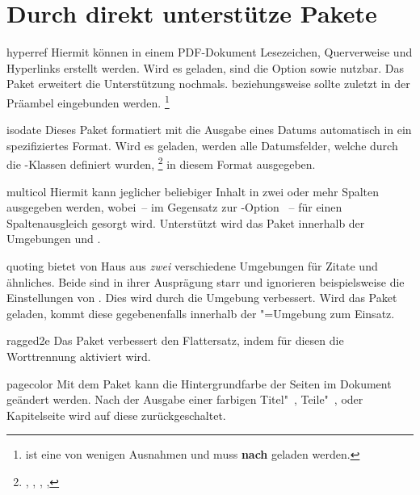 \section{Durch \TUDScript direkt unterstütze Pakete}
%
\begin{packages}
\item[hyperref]
  Hiermit können in einem PDF-Dokument Lesezeichen, Querverweise und   
  Hyperlinks erstellt werden. Wird es geladen, sind die Option 
   sowie  nutzbar. Das Paket 
   erweitert die Unterstützung nochmals.  
  beziehungsweise  sollte zuletzt in der Präambel eingebunden 
  werden.%
  \footnote{%
     ist eine von wenigen Ausnahmen und muss \textbf{nach} 
     geladen werden.
  }
\item[isodate]
  Dieses Paket formatiert mit  die Ausgabe 
  eines Datums automatisch in ein spezifiziertes Format. Wird es geladen, 
  werden alle Datumsfelder, welche durch die \TUDScript-Klassen definiert 
  wurden,%
  \footnote{%
    , , , , 
  }
  in diesem Format ausgegeben.
\item[multicol]
  Hiermit kann jeglicher beliebiger Inhalt in zwei oder mehr Spalten ausgegeben 
  werden, wobei~-- im Gegensatz zur -Option ~-- 
  für einen Spaltenausgleich gesorgt wird. Unterstützt wird das Paket innerhalb 
  der Umgebungen  und .
\item[quoting]
   bietet von Haus aus \emph{zwei} verschiedene Umgebungen für 
  Zitate und ähnliches. Beide sind in ihrer Ausprägung starr und ignorieren 
  beispielsweise die Einstellungen von . Dies wird durch die 
  Umgebung  verbessert. Wird das Paket geladen, kommt 
  diese gegebenenfalls innerhalb der "=Umgebung zum 
  Einsatz.
\item[ragged2e]
  Das Paket verbessert den Flattersatz, indem für diesen die Worttrennung 
  aktiviert wird.
\item[pagecolor]
  Mit dem Paket kann die Hintergrundfarbe der Seiten im Dokument geändert 
  werden. Nach der Ausgabe einer farbigen Titel"~, Teile"~, oder Kapitelseite 
  wird auf diese zurückgeschaltet.
\end{packages}



